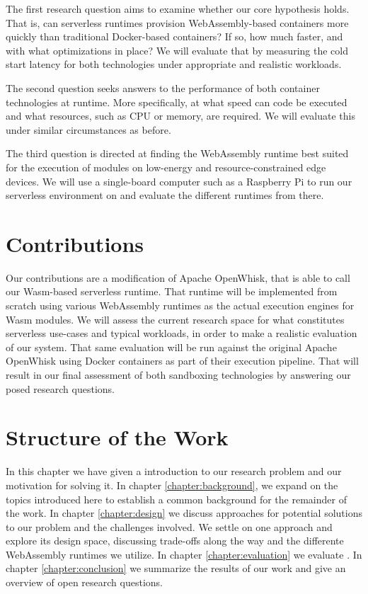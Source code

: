 The first research question aims to examine whether our core hypothesis holds. That is, can serverless runtimes provision WebAssembly-based containers more quickly than traditional Docker-based containers? If so, how much faster, and with what optimizations in place? We will evaluate that by measuring the cold start latency for both technologies under appropriate and realistic workloads.

The second question seeks answers to the performance of both container technologies at runtime. More specifically, at what speed can code be executed and what resources, such as CPU or memory, are required. We will evaluate this under similar circumstances as before.

The third question is directed at finding the WebAssembly runtime best suited for the execution of modules on low-energy and resource-constrained edge devices. We will use a single-board computer such as a Raspberry Pi to run our serverless environment on and evaluate the different runtimes from there.

\section{Contributions}

Our contributions are a modification of Apache OpenWhisk, that is able to call our Wasm-based serverless runtime. That runtime will be implemented from scratch using various WebAssembly runtimes as the actual execution engines for Wasm modules.
We will assess the current research space for what constitutes serverless use-cases and typical workloads, in order to make a realistic evaluation of our system. That same evaluation will be run against the original Apache OpenWhisk using Docker containers as part of their execution pipeline. That will result in our final assessment of both sandboxing technologies by answering our posed research questions.

\section{Structure of the Work}

In this chapter we have given a introduction to our research problem and our motivation for solving it. In chapter \ref{chapter:background}, we expand on the topics introduced here to establish a common background for the remainder of the work. In chapter \ref{chapter:design} we discuss approaches for potential solutions to our problem and the challenges involved. We settle on one approach and explore its design space, discussing trade-offs along the way and the differente WebAssembly runtimes we utilize. In chapter \ref{chapter:evaluation} we evaluate .
In chapter \ref{chapter:conclusion} we summarize the results of our work and give an overview of open research questions.